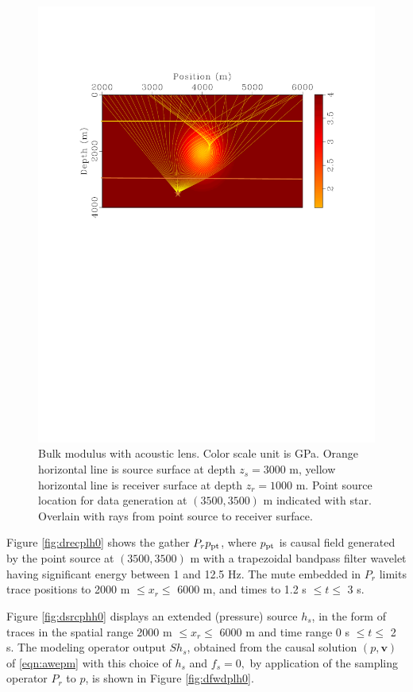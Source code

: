\documentclass[georeport,12pt]{geophysics}
\newcommand{\bv}{\mathbf{v}}
\begin{document}
\begin{figure}
  \includegraphics[width=\textwidth]{olensrays0.pdf}
  \caption{Bulk modulus with acoustic lens. Color scale unit is
    GPa. Orange horizontal line is source surface at depth $z_s= 3000$
    m, yellow horizontal
    line is receiver surface at depth $z_r=1000$ m. Point source location for data
    generation at $(3500, 3500)$ m indicated with star. Overlain with rays from point
    source to receiver surface.}
  \label{fig:olensrays0}
\end{figure}

Figure \ref{fig:drecplh0} shows the gather $P_rp_{\rm pt}$, where
$p_{\rm pt}$ is causal field generated by the point source at
$(3500,3500)$ m with a trapezoidal bandpass filter wavelet having
significant energy between 1 and 12.5 Hz. The mute embedded in $P_r$
limits trace positions to 2000 m $ \le x_r \le $ 6000 m, and times to
1.2 s $ \le t \le $ 3 s.

Figure \ref{fig:dsrcphh0} displays an extended (pressure) source $h_s$, in the form of
traces in the spatial range 2000 m $ \le x_r \le $ 6000 m and time
range 0 s $\le t \le $ 2 s. The modeling operator output $Sh_s$,
obtained from the causal solution $(p, \bv)$ of \ref{eqn:awepm}
with this choice of $h_s$ and $f_s=0,$ by application of the sampling
operator $P_r$ to $p$, is shown in Figure \ref{fig:dfwdplh0}.
\end{document}

